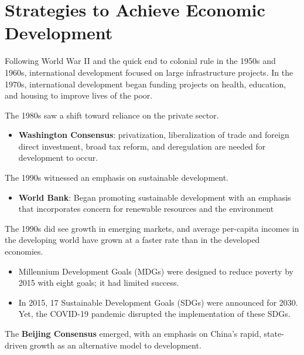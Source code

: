 \documentclass[
]{book}
\providecommand{\tightlist}{%
  \setlength{\itemsep}{0pt}\setlength{\parskip}{0pt}}
\begin{document}
\hypertarget{strategies-to-achieve-economic-development}{%
\section{Strategies to Achieve Economic Development}\label{strategies-to-achieve-economic-development}}

Following World War II and the quick end to colonial rule in the 1950s and 1960s, international development focused on large infrastructure projects. In the 1970s, international development began funding projects on health, education, and housing to improve lives of the poor.

The 1980s saw a shift toward reliance on the private sector.

\begin{itemize}
\tightlist
\item
  \textbf{Washington Consensus}: privatization, liberalization of trade and foreign direct investment, broad tax reform, and deregulation are needed for development to occur.
\end{itemize}

The 1990s witnessed an emphasis on sustainable development.

\begin{itemize}
\tightlist
\item
  \textbf{World Bank}: Began promoting sustainable development with an emphasis that incorporates concern for renewable resources and the environment
\end{itemize}

The 1990s did see growth in emerging markets, and average per-capita incomes in the developing world have grown at a faster rate than in the developed economies.

\begin{itemize}
\item
  Millennium Development Goals (MDGs) were designed to reduce poverty by 2015 with eight goals; it had limited success.
\item
  In 2015, 17 Sustainable Development Goals (SDGs) were announced for 2030. Yet, the COVID-19 pandemic disrupted the implementation of these SDGs.
\end{itemize}

The \textbf{Beijing Consensus} emerged, with an emphasis on China's rapid, state-driven growth as an alternative model to development.
\end{document}
